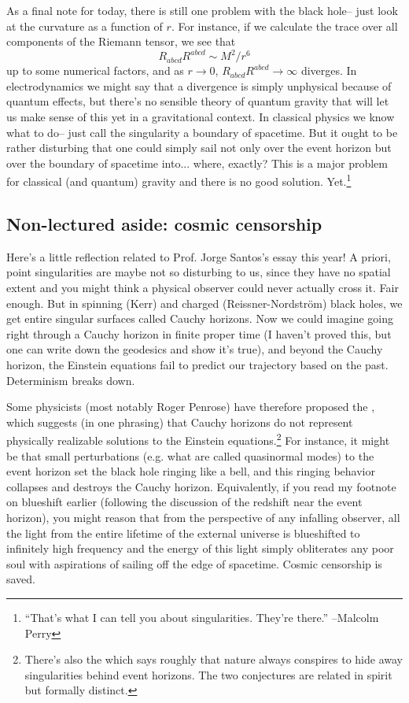 As a final note for today, there is still one problem with the black hole-- just look at the curvature as a function of $r$. For instance, if we calculate the trace over all components of the Riemann tensor, we see that
$$R_{abcd}R^{abcd}\sim M^2/r^6$$ up to some numerical factors, and as $r\to 0$, $R_{abcd} R^{abcd}\to \infty$ diverges. In electrodynamics we might say that a divergence is simply unphysical because of quantum effects, but there's no sensible theory of quantum gravity that will let us make sense of this yet in a gravitational context. In classical physics we know what to do-- just call the singularity a boundary of spacetime. But it ought to be rather disturbing that one could simply sail not only over the event horizon but over the boundary of spacetime into... where, exactly? This is a major problem for classical (and quantum) gravity and there is no good solution. Yet.\footnote{``That's what I can tell you about singularities. They're there.'' --Malcolm Perry}

\subsection*{Non-lectured aside: cosmic censorship} Here's a little reflection related to Prof. Jorge Santos's essay this year! A priori, point singularities are maybe not so disturbing to us, since they have no spatial extent and you might think a physical observer could never actually cross it. Fair enough. But in spinning (Kerr) and charged (Reissner-Nordstr\"om) black holes, we get entire singular surfaces called Cauchy horizons. Now we could imagine going right through a Cauchy horizon in finite proper time (I haven't proved this, but one can write down the geodesics and show it's true), and beyond the Cauchy horizon, the Einstein equations fail to predict our trajectory based on the past. Determinism breaks down. 

Some physicists (most notably Roger Penrose) have therefore proposed the , which suggests (in one phrasing) that Cauchy horizons do not represent physically realizable solutions to the Einstein equations.\footnote{There's also the  which says roughly that nature always conspires to hide away singularities behind event horizons. The two conjectures are related in spirit but formally distinct.} For instance, it might be that small perturbations (e.g. what are called quasinormal modes) to the event horizon set the black hole ringing like a bell, and this ringing behavior collapses and destroys the Cauchy horizon. Equivalently, if you read my footnote on blueshift earlier (following the discussion of the redshift near the event horizon), you might reason that from the perspective of any infalling observer, all the light from the entire lifetime of the external universe is blueshifted to infinitely high frequency and the energy of this light simply obliterates any poor soul with aspirations of sailing off the edge of spacetime. Cosmic censorship is saved.

